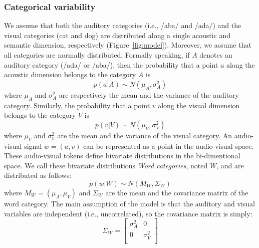 \documentclass[english,floatsintext,man]{apa6}
\theoremstyle{definition}
\theoremstyle{definition}
\theoremstyle{definition}
\theoremstyle{remark}
\begin{document}
\subsubsection{Categorical variability}\label{categorical-variability}

We assume that both the auditory categories (i.e., /aba/ and /ada/) and
the visual categories (cat and dog) are distributed along a single
acoustic and semantic dimension, respectively (Figure~\ref{fig:model}).
Moreover, we assume that all categories are normally distributed.
Formally speaking, if \(A\) denotes an auditory category (/ada/ or
/aba/), then the probability that a point \(a\) along the acoustic
dimension belongs to the category \(A\) is
\[ p(a | A) \sim  N(\mu_A, \sigma^2_A) \] where \(\mu_A\) and
\(\sigma^2_A\) are respectively the mean and the variance of the
auditory category. Similarly, the probability that a point \(v\) along
the visual dimension belongs to the category \(V\) is
\[ p(v | V) \sim  N(\mu_V, \sigma^2_V) \] where \(\mu_V\) and
\(\sigma^2_V\) are the mean and the variance of the visual category. An
audio-visual signal \(w=(a,v)\) can be represented as a point in the
audio-visual space. These audio-visual tokens define bivariate
distributions in the bi-dimentional space. We call these bivariate
distributions \emph{Word categories}, noted \(W\), and are distributed
as follows: \[ p(w | W) \sim  N(M_W, \Sigma_W) \] where
\(M_W=(\mu_A, \mu_V)\) and \(\Sigma_W\) are the mean and the covariance
matrix of the word category. The main assumption of the model is that
the auditory and visual variables are independent (i.e., uncorrelated),
so the covariance matrix is simply: \[
   \Sigma_W=
  \left[ {\begin{array}{cc}
   \sigma^2_A & 0 \\
   0 & \sigma^2_V \\
  \end{array} } \right]
\]
\end{document}
